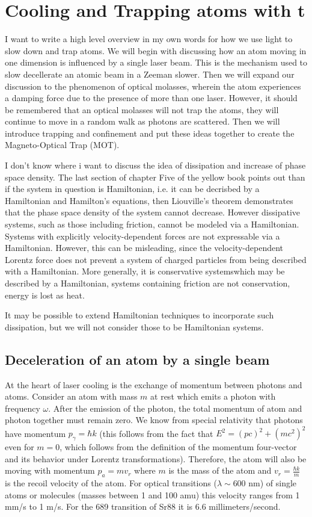\documentclass[../../main.tex]{subfiles}
\begin{document}
\chapter{Cooling and Trapping atoms with t}
I want to write a high level overview in my own words for how we use light to slow down and trap atoms. We will begin with discussing how an atom moving in one dimension is influenced by a single laser beam. This is the mechanism used to slow decellerate an atomic beam in a Zeeman slower. Then we will expand our discussion to the phenomenon of optical molasses, wherein the atom experiences a damping force due to the presence of more than one laser. However, it should be remembered that an optical molasses will not trap the atoms, they will continue to move in a random walk as photons are scattered. Then we will introduce trapping and confinement and put these ideas together to create the Magneto-Optical Trap (MOT). 

I don't know where i want to discuss the idea of dissipation and increase of phase space density. The last section of chapter Five of the yellow book points out than if the system in question is Hamiltonian, i.e. it can be decrisbed by a Hamiltonian and Hamilton's equations, then Liouville's theorem demonstrates that the phase space density of the system cannot decrease. However dissipative systems, such as those including friction, cannot be modeled via a Hamiltonian. Systems with explicitly velocity-dependent forces are not expressable via a Hamiltonian. However, this can be misleading, since the velocity-dependent Lorentz force does not prevent a system of charged particles from being described with a Hamiltonian. More generally, it is conservative systemswhich may be described by a Hamiltonian, systems containing friction are not conservation, energy is lost as heat. 

It may be possible to extend Hamiltonian techniques to incorporate such dissipation, but we will not consider those to be Hamiltonian systems.

\section{Deceleration of an atom by a single beam}
At the heart of laser cooling is the exchange of momentum between photons and atoms. Consider an atom with mass $m$ at rest which emits a photon with frequency $\omega$. After the emission of the photon, the total momentum of atom and photon together must remain zero. We know from special relativity that photons have momentum $p_\gamma=\hbar k$ (this follows from the fact that $E^2=(pc)^2+(mc^2)^2$ even for $m=0$, which follows from the definition of the momentum four-vector and its behavior under Lorentz transformations). Therefore, the atom will also be moving with momentum $p_a=m v_r$ where $m$ is the mass of the atom and $v_r=\frac{\hbar k}{m}$ is the recoil velocity of the atom. For optical transitions ($\lambda\sim 600$ nm) of single atoms or molecules (masses between 1 and 100 amu) this velocity ranges from 1 mm/s to 1 m/s. For the 689 transition of Sr88 it is 6.6 millimeters/second. 
\end{document}
